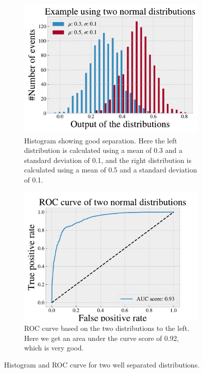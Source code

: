 \begin{figure}[H]
    \centering
    \begin{subfigure}{.45\textwidth}
        \includegraphics[width=\textwidth]{Figures/Machinelearning/histo_example_Sep.pdf}
        \caption{Histogram showing good separation. Here the left distribution is calculated using a mean of 0.3 and a standard 
        deviation of 0.1, and the right distribution is calculated using a mean of 0.5 and a standard deviation of 0.1.}
        \label{fig:dist_ex_good}
    \end{subfigure}
    \hfill
    \begin{subfigure}{.45\textwidth}
        \includegraphics[width=\textwidth]{Figures/Machinelearning/ROC_curve_example_Sep.pdf}
        \caption{ROC curve based on the two distributions to the left. Here we get an area under the curve score of 0.92, which is very good. }
        \label{fig:ROC_curve_ex_good}
    \end{subfigure}
    \hfill        
    \caption{Histogram and ROC curve for two well separated distributions.}
    \label{fig:roc_example_good}
\end{figure}

